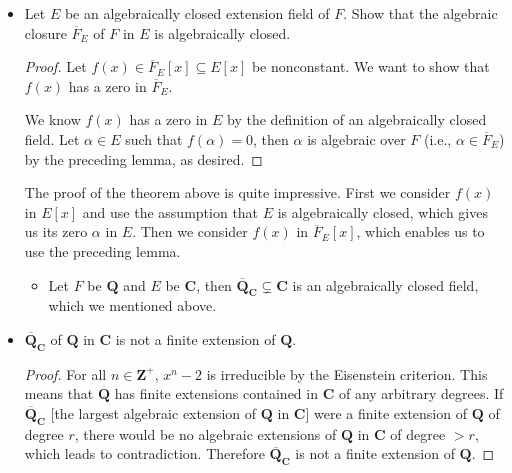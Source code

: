 \documentclass[11pt]{article}
\newcommand{\Z}{\mathbf{Z}}
\newcommand{\Q}{\mathbf{Q}}
\newcommand{\C}{\mathbf{C}}
\newcommand{\clos}[1]{\overline{#1}}
\begin{document}
\begin{itemize}
\begin{itemize}
        Since $\alpha \in E$ is algebraic over $F$ implies that $\alpha \in E$ is algebraic over $\clos{F}_E \supseteq F$, proving the statement above tells us that 
        \begin{center}
            $\alpha \in E$ is algebraic over $F$ iff $\alpha \in E$ is algebraic over $\clos{F}_E$, or equivalently, $\clos{F}_E = \clos{\clos{F}_E}_E$.
        \end{center}
        \begin{proof}
            Suppose $\alpha \in E$ is algebraic over $\clos{F}_E$, then by the previous lemma $\clos{F}_E(\alpha)$ is algebraic over $\clos{F}_E$, and of course $\clos{F}_E$ is algebraic over $F$. By the previous lemma it follows that $\clos{F}_E(\alpha)$ is algebraic over $F$, meaning that $\alpha$ is algebraic over $F$.
        \end{proof}
    \end{itemize}
    \item Let $E$ be an algebraically closed extension field of $F$. Show that the algebraic closure $\clos{F}_E$ of $F$ in $E$ is algebraically closed.
    \begin{proof}
        Let $f(x) \in \clos{F}_E[x] \subseteq E[x]$ be nonconstant. We want to show that $f(x)$ has a zero in $\clos{F}_E$.
        
        We know $f(x)$ has a zero in $E$ by the definition of an algebraically closed field. Let $\alpha \in E$ such that $f(\alpha) = 0$, then $\alpha$ is algebraic over $F$ (i.e., $\alpha \in \clos{F}_E$) by the preceding lemma, as desired.
    \end{proof}
    The proof of the theorem above is quite impressive. First we consider $f(x)$ in $E[x]$ and use the assumption that $E$ is algebraically closed, which gives us its zero $\alpha$ in $E$. Then we consider $f(x)$ in $\clos{F}_E[x]$, which enables us to use the preceding lemma.
    \begin{itemize}
        \item Let $F$ be $\Q$ and $E$ be $\C$, then $\clos{\Q}_\C \subsetneq \C$ is an algebraically closed field, which we mentioned above.
    \end{itemize}
    \item $\clos{\Q}_\C$ of $\Q$ in $\C$ is not a finite extension of $\Q$.
    \begin{proof}
        For all $n \in \Z^+$, $x^n-2$ is irreducible by the Eisenstein criterion. This means that $\Q$ has finite extensions contained in $\C$ of any arbitrary degrees. If $\clos{\Q}_\C$ [the largest algebraic extension of $\Q$ in $\C$] were a finite extension of $\Q$ of degree $r$, there would be no algebraic extensions of $\Q$ in $\C$ of degree $>r$, which leads to contradiction. Therefore $\clos{\Q}_\C$ is not a finite extension of $\Q$.
    \end{proof}
\end{itemize}
\end{document}
